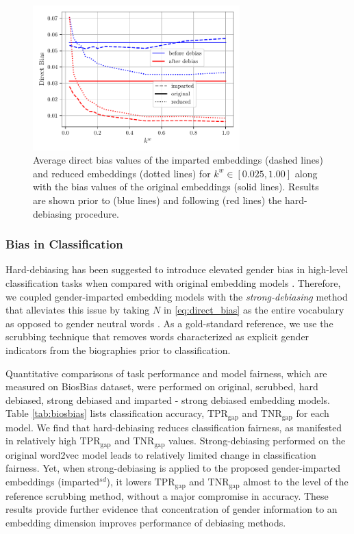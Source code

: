 \documentclass[11pt,a4paper]{article}
\begin{document}
\begin{figure}
	\centering
	\includegraphics[width=8.0cm]{Figures/gender_bias_reduction.pdf}
	\caption{Average direct bias values of the imparted embeddings (dashed lines) and reduced embeddings (dotted lines) for $k^w \in [0.025,1.00]$ along with the bias values of the original embeddings (solid lines). Results are shown prior to (blue lines) and following (red lines) the hard-debiasing procedure.}
	\label{fig:bias}
\end{figure}

\subsubsection{Bias in Classification}

Hard-debiasing has been suggested to introduce elevated gender bias in high-level classification tasks when compared with original embedding models \citep{prost19biasTextClassif}. Therefore, we coupled gender-imparted embedding models with the \textit{strong-debiasing} method that alleviates this issue by taking $N$ in \eqref{eq:direct_bias} as the entire vocabulary as opposed to gender neutral words \citep{prost19biasTextClassif}. As a gold-standard reference, we use the scrubbing technique \citep{de19biosbias} that removes words characterized as explicit gender indicators from the biographies prior to classification.

Quantitative comparisons of task performance and model fairness, which are measured on BiosBias dataset, were performed on original, scrubbed, hard debiased, strong debiased and imparted - strong debiased embedding models. Table \ref{tab:biosbias} lists classification accuracy, $\text{TPR}_{\text{gap}}$ and $\text{TNR}_{\text{gap}}$ for each model. We find that hard-debiasing reduces classification fairness, as manifested in relatively high $\text{TPR}_{\text{gap}}$ and $\text{TNR}_{\text{gap}}$ values. Strong-debiasing performed on the original word2vec model leads to relatively limited change in classification fairness. Yet, when strong-debiasing is applied to the proposed gender-imparted embeddings (imparted$^{sd}$), it lowers $\text{TPR}_{\text{gap}}$ and $\text{TNR}_{\text{gap}}$ almost to the level of the reference scrubbing method, without a major compromise in accuracy. These results provide further evidence that concentration of gender information to an embedding dimension improves performance of debiasing methods.
\end{document}
